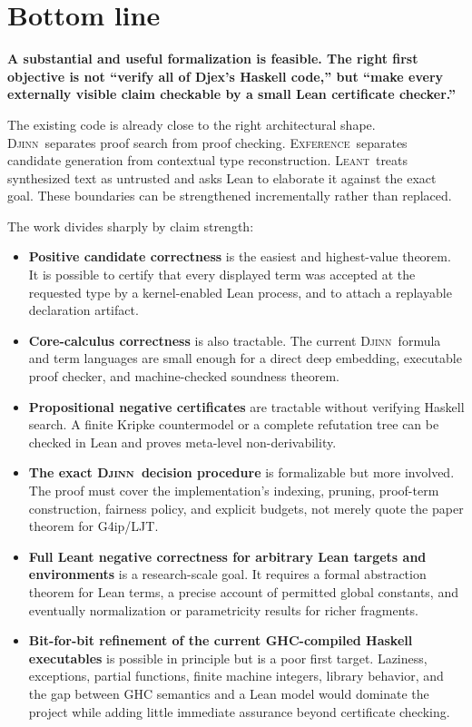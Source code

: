 \documentclass[11pt,letterpaper,openany]{report}
\theoremstyle{definition}
\theoremstyle{remark}
\newcommand{\Djinn}{\textsc{Djinn}}
\newcommand{\Exference}{\textsc{Exference}}
\newcommand{\Leant}{\textsc{Leant}}
\newcommand{\claim}[1]{\par\medskip\noindent\colorbox{AccentLight}{\parbox{\dimexpr\linewidth-2\fboxsep\relax}{\textbf{#1}}}\par\medskip}
\begin{document}
\section{Bottom line}

\claim{A substantial and useful formalization is feasible. The right first objective is not ``verify all of Djex's Haskell code,'' but ``make every externally visible claim checkable by a small Lean certificate checker.''}

The existing code is already close to the right architectural shape. \Djinn\ separates proof search from proof checking. \Exference\ separates candidate generation from contextual type reconstruction. \Leant\ treats synthesized text as untrusted and asks Lean to elaborate it against the exact goal. These boundaries can be strengthened incrementally rather than replaced.

The work divides sharply by claim strength:

\begin{itemize}
\item \textbf{Positive candidate correctness} is the easiest and highest-value theorem. It is possible to certify that every displayed term was accepted at the requested type by a kernel-enabled Lean process, and to attach a replayable declaration artifact.
\item \textbf{Core-calculus correctness} is also tractable. The current \Djinn\ formula and term languages are small enough for a direct deep embedding, executable proof checker, and machine-checked soundness theorem.
\item \textbf{Propositional negative certificates} are tractable without verifying Haskell search. A finite Kripke countermodel or a complete refutation tree can be checked in Lean and proves meta-level non-derivability.
\item \textbf{The exact \Djinn\ decision procedure} is formalizable but more involved. The proof must cover the implementation's indexing, pruning, proof-term construction, fairness policy, and explicit budgets, not merely quote the paper theorem for G4ip/LJT.
\item \textbf{Full Leant negative correctness for arbitrary Lean targets and environments} is a research-scale goal. It requires a formal abstraction theorem for Lean terms, a precise account of permitted global constants, and eventually normalization or parametricity results for richer fragments.
\item \textbf{Bit-for-bit refinement of the current GHC-compiled Haskell executables} is possible in principle but is a poor first target. Laziness, exceptions, partial functions, finite machine integers, library behavior, and the gap between GHC semantics and a Lean model would dominate the project while adding little immediate assurance beyond certificate checking.
\end{itemize}
\end{document}
